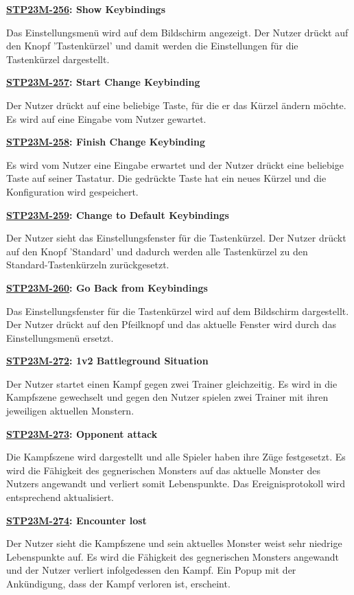 \textbf{\hyperlink{T256}{\hypertarget{S256}{STP23M-256}}: Show Keybindings}

Das Einstellungsmenü wird auf dem Bildschirm angezeigt. Der Nutzer drückt auf den Knopf 'Tastenkürzel' und damit werden die Einstellungen für die Tastenkürzel dargestellt.

\textbf{\hyperlink{T257}{\hypertarget{S257}{STP23M-257}}: Start Change Keybinding}

Der Nutzer drückt auf eine beliebige Taste, für die er das Kürzel ändern möchte. Es wird auf eine Eingabe vom Nutzer gewartet.

\textbf{\hyperlink{T258}{\hypertarget{S258}{STP23M-258}}: Finish Change Keybinding}

Es wird vom Nutzer eine Eingabe erwartet und der Nutzer drückt eine beliebige Taste auf seiner Tastatur. Die gedrückte Taste hat ein neues Kürzel und die Konfiguration wird gespeichert.

\textbf{\hyperlink{T259}{\hypertarget{S259}{STP23M-259}}: Change to Default Keybindings}

Der Nutzer sieht das Einstellungsfenster für die Tastenkürzel. Der Nutzer drückt auf den Knopf 'Standard' und dadurch werden alle Tastenkürzel zu den Standard-Tastenkürzeln zurückgesetzt.

\textbf{\hyperlink{T260}{\hypertarget{S260}{STP23M-260}}: Go Back from Keybindings}

Das Einstellungsfenster für die Tastenkürzel wird auf dem Bildschirm dargestellt. Der Nutzer drückt auf den Pfeilknopf und das aktuelle Fenster wird durch das Einstellungsmenü ersetzt.

\textbf{\hyperlink{T272}{\hypertarget{S272}{STP23M-272}}: 1v2 Battleground Situation}

Der Nutzer startet einen Kampf gegen zwei Trainer gleichzeitig. Es wird in die Kampfszene gewechselt und gegen den Nutzer spielen zwei Trainer mit ihren jeweiligen aktuellen Monstern. 

\textbf{\hyperlink{T273}{\hypertarget{S273}{STP23M-273}}: Opponent attack}

Die Kampfszene wird dargestellt und alle Spieler haben ihre Züge festgesetzt. Es wird die Fähigkeit des gegnerischen Monsters auf das aktuelle Monster des Nutzers angewandt und verliert somit Lebenspunkte. Das Ereignisprotokoll wird entsprechend aktualisiert.

\textbf{\hyperlink{T274}{\hypertarget{S274}{STP23M-274}}: Encounter lost}

Der Nutzer sieht die Kampfszene und sein aktuelles Monster weist sehr niedrige Lebenspunkte auf. Es wird die Fähigkeit des gegnerischen Monsters angewandt und der Nutzer verliert infolgedessen den Kampf. Ein Popup mit der Ankündigung, dass der Kampf verloren ist, erscheint.

